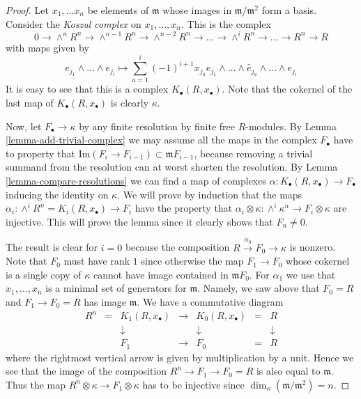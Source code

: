 \begin{proof}
Let $x_1 , \ldots x_n$ be elements of $\mathfrak m$
whose images in $\mathfrak m / \mathfrak m^2$ form a basis.
Consider the {\it Koszul complex} on $x_1, \ldots, x_n$.
This is the complex
$$
0 \to \wedge^n R^n \to \wedge^{n-1} R^n \to \wedge^{n-2} R^n \to
\ldots \to \wedge^i R^n \to \ldots \to R^n \to R
$$
with maps given by
$$
e_{j_1} \wedge \ldots \wedge e_{j_i}
\longmapsto
\sum_{a = 1}^i (-1)^{i + 1} x_{j_a} e_{j_1} \wedge \ldots
\wedge \hat e_{j_a} \wedge \ldots \wedge e_{j_i}
$$
It is easy to see that this is a complex $K_{\bullet}(R, x_{\bullet})$.
Note that the cokernel of the last map of $K_{\bullet}(R, x_{\bullet})$
is clearly $\kappa$.

\medskip\noindent
Now, let $F_{\bullet} \to \kappa$ by any finite resolution by
finite free $R$-modules. By Lemma \ref{lemma-add-trivial-complex}
we may assume all the maps in the complex $F_{\bullet}$
have to property that $\text{Im}(F_i \to F_{i-1})
\subset \mathfrak m F_{i-1}$, because removing a trivial
summand from the resolution can at worst shorten the resolution.
By Lemma \ref{lemma-compare-resolutions} we can find a map
of complexes $\alpha : K_{\bullet}(R, x_{\bullet}) \to F_{\bullet}$
inducing the identity on $\kappa$. We will prove by induction
that the maps $\alpha_i : \wedge^i R^n = K_i(R, x_{\bullet}) \to F_i$
have the property that $\alpha_i \otimes \kappa
: \wedge^i \kappa^n \to F_i \otimes \kappa$ are injective.
This will prove the lemma since it clearly shows that
$F_n \not = 0$.

\medskip\noindent
The result is clear for $i = 0$ because the composition
$R \xrightarrow{\alpha_0} F_0 \to \kappa$ is nonzero.
Note that $F_0$ must have rank $1$ since
otherwise the map $F_1 \to F_0$ whose cokernel is a single
copy of $\kappa$ cannot have image contained in $\mathfrak m F_0$.
For $\alpha_1$ we use that $x_1, \ldots, x_n$ is a minimal
set of generators for $\mathfrak m$. Namely, we saw above that
$F_0 = R$ and $F_1 \to F_0 = R$ has image $\mathfrak m$.
We have a commutative diagram
$$
\begin{matrix}
R^n & = & K_1(R, x_{\bullet}) & \to & K_0(R, x_{\bullet}) & = & R \\
& & \downarrow & & \downarrow & & \downarrow \\
& & F_1 & \to & F_0 & = & R
\end{matrix}
$$
where the rightmost vertical arrow is given by multiplication
by a unit. Hence we see that the image of the composition
$R^n \to F_1 \to F_0 = R$ is also equal to $\mathfrak m$.
Thus the map $R^n \otimes \kappa \to F_1 \otimes \kappa$
has to be injective since $\dim_\kappa (\mathfrak m / \mathfrak m^2) = n$.


\end{proof}
